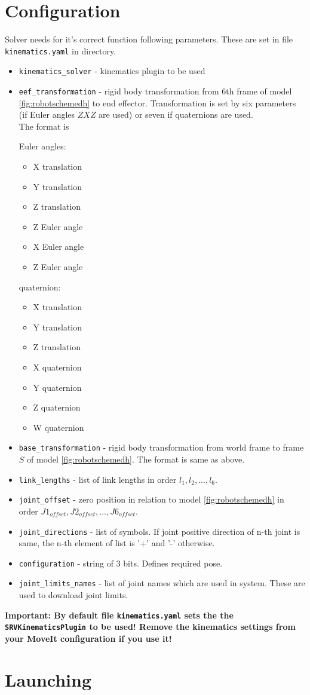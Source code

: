 \documentclass[twoside]{article}
\begin{document}
\section{Configuration}
\label{sec:configuration}
Solver needs for it's correct function following parameters.
These are set in file \texttt{kinematics.yaml} in  directory.
\begin{itemize}
	\item \texttt{kinematics\_solver} - kinematics plugin to be used
	\item \texttt{eef\_transformation} - rigid body transformation from 6th frame of model \ref{fig:robotschemedh} to end effector. Transformation is set by six parameters (if Euler angles $ ZXZ $ are used) or seven if quaternions are used.\\
	The format is
	\begin{multicols}{2}
		Euler angles:
		\begin{itemize}
			\item X translation
			\item Y translation
			\item Z translation
			\item Z Euler angle
			\item X Euler angle
			\item Z Euler angle
		\end{itemize}
	\columnbreak
	quaternion:
	\begin{itemize}
		\item X translation
		\item Y translation
		\item Z translation
		\item X quaternion
		\item Y quaternion
		\item Z quaternion
		\item W quaternion
	\end{itemize}
	\end{multicols}

	\item \texttt{base\_transformation} - rigid body transformation from world frame to frame $ S $ of model \ref{fig:robotschemedh}. The format is same as above.
	\item \texttt{link\_lengths} - list of link lengths in order $ l_{1},l_{2},..., l_{6} $.
	\item \texttt{joint\_offset} - zero position in relation to model \ref{fig:robotschemedh} in order $ J1_{offset}, J2_{offset},...,J6_{offset} $.
	\item \texttt{joint\_directions} - list of symbols. If joint positive direction of n-th joint is same, the n-th element of list is '+' and '-' otherwise.
	\item \texttt{configuration} - string of 3 bits. Defines required pose.
	\item \texttt{joint\_limits\_names} - list of joint names which are used in system. These are used to download joint limits.
\end{itemize}

\textbf{
	Important: By default file \texttt{kinematics.yaml} sets the the \texttt{SRVKinematicsPlugin} to be used!
	Remove the kinematics settings from your MoveIt configuration if you use it!
}

\section{Launching}
\label{sec:launching}
\end{document}
